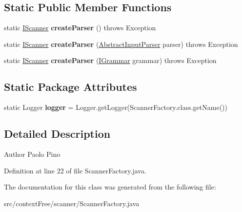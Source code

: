 \subsection*{Static Public Member Functions}
\begin{DoxyCompactItemize}
\item 
\hypertarget{classcontext_free_1_1scanner_1_1_scanner_factory_a99f862908e54a145d089b3ad2f3088db}{static \hyperlink{interfacecontext_free_1_1scanner_1_1_i_scanner}{I\-Scanner} {\bfseries create\-Parser} ()  throws Exception}\label{classcontext_free_1_1scanner_1_1_scanner_factory_a99f862908e54a145d089b3ad2f3088db}

\item 
\hypertarget{classcontext_free_1_1scanner_1_1_scanner_factory_ae60f881ed9732f77c4c58498ecb4d570}{static \hyperlink{interfacecontext_free_1_1scanner_1_1_i_scanner}{I\-Scanner} {\bfseries create\-Parser} (\hyperlink{classinput_parser_1_1_abstract_input_parser}{Abstract\-Input\-Parser} parser)  throws Exception}\label{classcontext_free_1_1scanner_1_1_scanner_factory_ae60f881ed9732f77c4c58498ecb4d570}

\item 
\hypertarget{classcontext_free_1_1scanner_1_1_scanner_factory_a74777b751fa30fb3b6f61d15aa1f991f}{static \hyperlink{interfacecontext_free_1_1scanner_1_1_i_scanner}{I\-Scanner} {\bfseries create\-Parser} (\hyperlink{interfacecontext_free_1_1grammar_1_1_i_grammar}{I\-Grammar} grammar)  throws Exception }\label{classcontext_free_1_1scanner_1_1_scanner_factory_a74777b751fa30fb3b6f61d15aa1f991f}

\end{DoxyCompactItemize}
\subsection*{Static Package Attributes}
\begin{DoxyCompactItemize}
\item 
\hypertarget{classcontext_free_1_1scanner_1_1_scanner_factory_a8adeb18ed23d59cc01ab81a379aa9a54}{static Logger {\bfseries logger} = Logger.\-get\-Logger(Scanner\-Factory.\-class.\-get\-Name())}\label{classcontext_free_1_1scanner_1_1_scanner_factory_a8adeb18ed23d59cc01ab81a379aa9a54}

\end{DoxyCompactItemize}


\subsection{Detailed Description}
\begin{DoxyAuthor}{Author}
Paolo Pino 
\end{DoxyAuthor}


Definition at line 22 of file Scanner\-Factory.\-java.



The documentation for this class was generated from the following file\-:\begin{DoxyCompactItemize}
\item 
src/context\-Free/scanner/Scanner\-Factory.\-java\end{DoxyCompactItemize}
